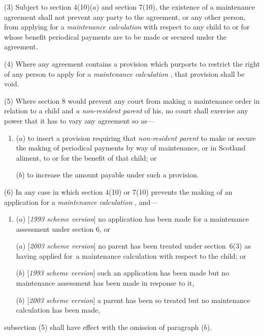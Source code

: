 \documentclass[12pt,a4paper]{article}
\begin{document}
(3) 
Subject to section 4(10)($a$) and section 7(10),  %
the existence of a maintenance agreement shall not prevent any party to the agreement, or any other person, from applying for a 
\emph{maintenance calculation}  %
with respect to any child to or for whose benefit periodical payments are to be made or secured under the agreement.

(4) Where any agreement contains a provision which purports to restrict the right of any person to apply for a 
\emph{maintenance calculation}%
, that provision shall be void.

(5) Where section 8 would prevent any court from making a maintenance order in relation to a child and 
\emph{a non-resident parent}  %
of his, no court shall exercise any power that it has to vary any agreement so as—
\begin{enumerate}\item[]
($a$) to insert a provision requiring that 
\emph{non-resident parent}  %
to make or secure the making of periodical payments by way of maintenance, or in Scotland aliment, to or for the benefit of that child; or

($b$) to increase the amount payable under such a provision.
\end{enumerate}

(6) In any case in which section 4(10) or 7(10) prevents the making of an application for a 
\emph{maintenance calculation}%
, and—
\begin{enumerate}\item[]
($a$) [\emph{1993 scheme version}] no application has been made for a maintenance assessment under section 6, or

($a$) [\emph{2003 scheme version}] no parent has been treated under section~6(3)  as having applied for~a maintenance calculation with respect to the child; or

($b$) [\emph{1993 scheme version}] such an application has been made but no maintenance assessment has been made in response to it,

($b$) [\emph{2003 scheme version}] a parent has been so treated but no maintenance calculation has been made,
\end{enumerate}
subsection (5) shall have effect with the omission of paragraph ($b$).
\end{document}
